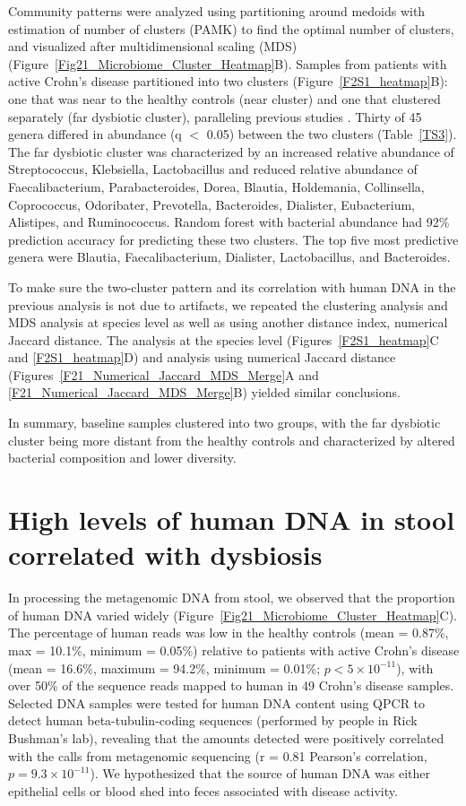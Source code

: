 Community patterns were analyzed using partitioning around medoids with estimation of number of clusters (PAMK) to find the optimal number of clusters, and visualized after multidimensional scaling (MDS) (Figure~\ref{Fig21_Microbiome_Cluster_Heatmap}B). Samples from patients with active Crohn's disease partitioned into two clusters (Figure~\ref{F2S1_heatmap}B): one that was near to the healthy controls (near cluster) and one that clustered separately (far dysbiotic cluster), paralleling previous studies \citep{Frank:2007hn, gevers2014treatment}. Thirty of 45 genera differed in abundance (q $<$ 0.05) between the two clusters (Table~\ref{TS3}). The far dysbiotic cluster was characterized by an increased relative abundance of Streptococcus, Klebsiella, Lactobacillus and reduced relative abundance of Faecalibacterium, Parabacteroides, Dorea, Blautia, Holdemania, Collinsella, Coprococcus, Odoribater, Prevotella, Bacteroides, Dialister, Eubacterium, Alistipes, and Ruminococcus. Random forest with bacterial abundance had 92\% prediction accuracy for predicting these two clusters. The top five most predictive genera were Blautia, Faecalibacterium, Dialister, Lactobacillus, and Bacteroides. 

To make sure the two-cluster pattern and its correlation with human DNA in the previous analysis is not due to artifacts, we repeated the clustering analysis and  MDS analysis at species level as well as using another distance index, numerical Jaccard distance. The analysis at the species level (Figures~\ref{F2S1_heatmap}C and \ref{F2S1_heatmap}D) and analysis using numerical Jaccard distance (Figures~\ref{F21_Numerical_Jaccard_MDS_Merge}A and \ref{F21_Numerical_Jaccard_MDS_Merge}B) yielded similar conclusions. 


In summary, baseline samples clustered into two groups, with the far dysbiotic cluster being more distant from the healthy controls and characterized by altered bacterial composition and lower diversity.





\section{High levels of human DNA in stool correlated with dysbiosis}
In processing the metagenomic DNA from stool, we observed that the proportion of human DNA varied widely (Figure~\ref{Fig21_Microbiome_Cluster_Heatmap}C). The percentage of human reads was low in the healthy controls (mean = 0.87\%, max = 10.1\%, minimum = 0.05\%) relative to patients with active Crohn's disease (mean = 16.6\%, maximum = 94.2\%, minimum = 0.01\%; $p < 5 \times 10^{-11}$), with over 50\% of the sequence reads mapped to human in 49 Crohn's disease samples. Selected DNA samples were tested for human DNA content using QPCR to detect human beta-tubulin-coding sequences (performed by people in Rick Bushman's lab), revealing that the amounts detected were positively correlated with the calls from metagenomic sequencing (r = 0.81 Pearson's correlation, $p = 9.3 \times 10^{-11}$). We hypothesized that the source of human DNA was either epithelial cells or blood shed into feces associated with disease activity.


